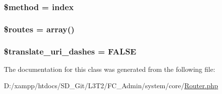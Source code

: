 \subsubsection[{\$method}]{\setlength{\rightskip}{0pt plus 5cm}\$method = \textquotesingle{}index\textquotesingle{}}\label{class_c_i___router_a12661b2fc0f57f97e30a1620889ce9c6}
\hypertarget{class_c_i___router_a8f7eb04a54e0f0bfc0cedeb9899ce4a8}{}
\subsubsection[{\$routes}]{\setlength{\rightskip}{0pt plus 5cm}\$routes = array()}\label{class_c_i___router_a8f7eb04a54e0f0bfc0cedeb9899ce4a8}
\hypertarget{class_c_i___router_a9693c124c7019ed8ec57166661044ba2}{}
\subsubsection[{\$translate\+\_\+uri\+\_\+dashes}]{\setlength{\rightskip}{0pt plus 5cm}\$translate\+\_\+uri\+\_\+dashes = F\+A\+L\+S\+E}\label{class_c_i___router_a9693c124c7019ed8ec57166661044ba2}


The documentation for this class was generated from the following file\+:\begin{DoxyCompactItemize}
\item 
D\+:/xampp/htdocs/\+S\+D\+\_\+\+Git/\+L3\+T2/\+F\+C\+\_\+\+Admin/system/core/\hyperlink{_router_8php}{Router.\+php}\end{DoxyCompactItemize}
